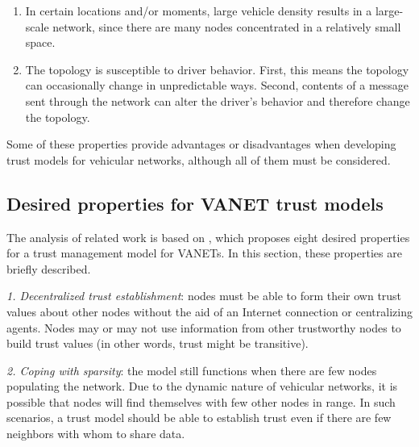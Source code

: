\begin{enumerate}
	\item 	In certain locations and/or moments, large vehicle density results in a large-scale network, since there are many nodes concentrated in a relatively small space.
	
	\item 	The topology is susceptible to driver behavior.
			First, this means the topology can occasionally change in unpredictable ways.
			Second, contents of a message sent through the network can alter the driver's behavior and therefore change the topology.
			
\end{enumerate}

Some of these properties provide advantages or disadvantages when developing trust models for vehicular networks, although all of them must be considered.


\subsection{Desired properties for VANET trust models}
\label{section:desired}

The analysis of related work is based on \citep{zhang2011survey}, which proposes eight desired properties for a trust management model for VANETs.
In this section, these properties are briefly described.

\textit{1. Decentralized trust establishment}: nodes must be able to form their own trust values about other nodes without the aid of an Internet connection or centralizing agents.
Nodes may or may not use information from other trustworthy nodes to build trust values (in other words, trust might be transitive).

\textit{2. Coping with sparsity}: the model still functions when there are few nodes populating the network.
Due to the dynamic nature of vehicular networks, it is possible that nodes will find themselves with few other nodes in range.
In such scenarios, a trust model should be able to establish trust even if there are few neighbors with whom to share data.

